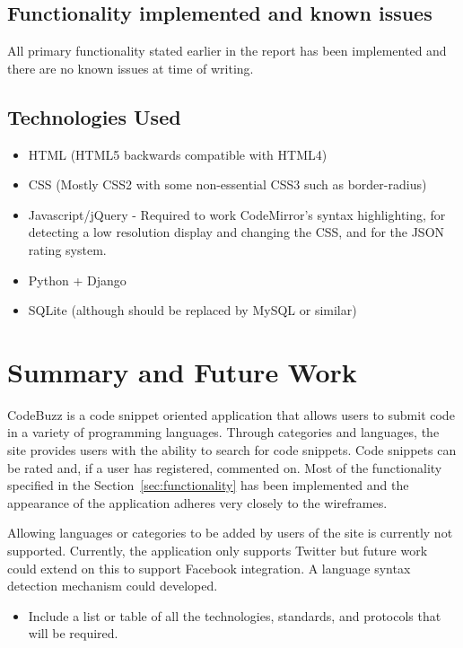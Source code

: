 \documentclass{sig-alt-release2}
\begin{document}
\subsection{Functionality implemented and known issues}

All primary functionality stated earlier in the report has been implemented and
there are no known issues at time of writing.

\subsection{Technologies Used}

\begin{itemize}
\item HTML (HTML5 backwards compatible with HTML4)
\item CSS (Mostly CSS2 with some non-essential CSS3 such as border-radius)
\item Javascript/jQuery - Required to work CodeMirror's syntax highlighting,
for detecting a low resolution display and changing the CSS, and for the JSON
rating system.
\item Python + Django
\item SQLite (although should be replaced by MySQL or similar)
\end{itemize}

\section{Summary and Future Work}

CodeBuzz is a code snippet oriented application that allows users to submit code
in a variety of programming languages. Through categories and languages,
the site provides users with the ability to search for code snippets.
Code snippets can be rated and, if a user has registered, commented on.
Most of the functionality specified in the
Section~\ref{sec:functionality} has been implemented and the appearance
of the application adheres very closely to the wireframes.

Allowing languages or categories to be added by users of the site is
currently not supported.
Currently, the application only supports Twitter but future work could
extend on this to support Facebook integration. A language syntax
detection mechanism could developed.

\begin{itemize}
\item Include a list or table of all the technologies, standards,
and protocols that will be required.
\end{itemize}
\end{document}
